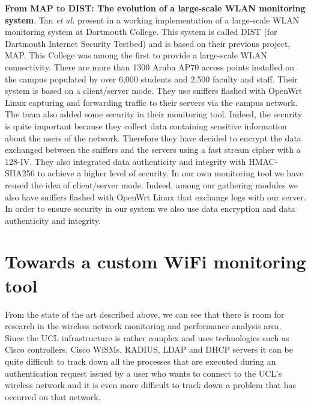 \textbf{From MAP to DIST: The evolution of a large-scale WLAN monitoring system}. Tan \textit{et al.} present in \citep{article3} a working implementation of a large-scale WLAN monitoring system at Dartmouth College. This system is called DIST (for Dartmouth Internet Security Testbed) and is based on their previous project, MAP. This College was among the first to provide a large-scale WLAN connectivity. There are more than 1300 Aruba AP70 access points installed on the campus populated by over 6,000 students and 2,500 faculty and staff. Their system is based on a client/server mode. They use sniffers flashed with OpenWrt Linux capturing and forwarding traffic to their servers via the campus network. The team also added some security in their monitoring tool. Indeed, the security is quite important because they collect data containing sensitive information about the users of the network. Therefore they have decided to encrypt the data exchanged between the sniffers and the servers using a fast stream cipher with a 128-IV. They also integrated data authenticity and integrity with HMAC-SHA256 to achieve a higher level of security. In our own monitoring tool we have reused the idea of client/server mode. Indeed, among our gathering modules we also have sniffers flashed with OpenWrt Linux that exchange logs with our server. In order to ensure security in our system we also use data encryption and data authenticity and integrity.



\section{Towards a custom WiFi monitoring tool}
From the state of the art described above, we can see that there is room for research in the wireless network monitoring and performance analysis area.\\
Since the UCL infrastructure is rather complex and uses technologies such as Cisco controllers, Cisco WiSMs, RADIUS, LDAP and DHCP servers it can be quite difficult to track down all the processes that are executed during an authentication request issued by a user who wants to connect to the UCL's wireless network and it is even more difficult to track down a problem that has occurred on that network.


